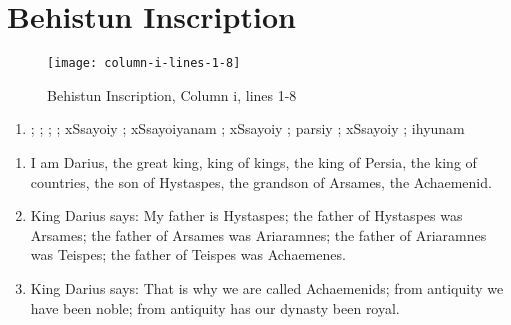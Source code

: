 \section{Behistun Inscription}

\begin{figure}[H]
    \texttt{[image: column-i-lines-1-8]}
    \caption{Behistun Inscription, Column i, lines 1-8\cite{BehistunT01}}
\end{figure}

\begin{enumerate}
    \item {\oldpersian ;} {\oldpersian ;}   {\oldpersian ;}  {\oldpersian ;} {\oldpersian xSsayoiy} {\oldpersian ;} {\oldpersian xSsayoiyanam} {\oldpersian ;} {\oldpersian xSsayoiy} {\oldpersian ;} {\oldpersian parsiy} {\oldpersian ;} {\oldpersian xSsayoiy} {\oldpersian ;} {\oldpersian ihyunam}
\end{enumerate}

\begin{enumerate}
    \item I am Darius, the great king, king of kings, the king of Persia, the king of countries, the son of Hystaspes,
         the grandson of Arsames, the Achaemenid.
    \item King Darius says: My father is Hystaspes; the father of Hystaspes was Arsames; the father of Arsames was
          Ariaramnes; the father of Ariaramnes was Teispes; the father of Teispes was Achaemenes.
    \item King Darius says: That is why we are called Achaemenids; from antiquity we have been noble; from antiquity
          has our dynasty been royal.
\end{enumerate}
